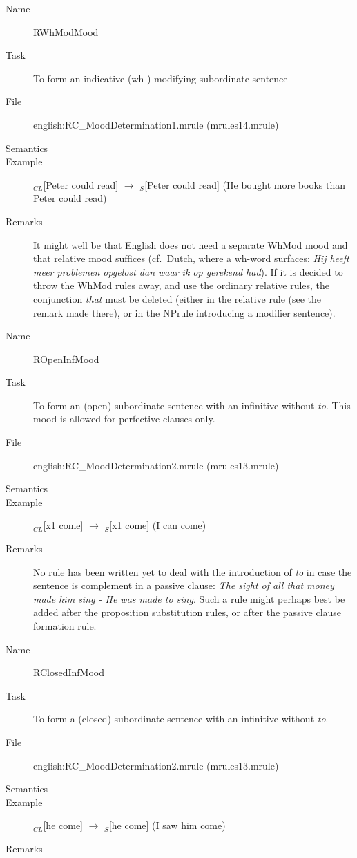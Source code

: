 \begin{description}
\vspace{1 cm}
\begin{description}
\item[Name] RWhModMood
\item[Task] To form an indicative (wh-) modifying subordinate sentence
\item[File] english:RC\_MoodDetermination1.mrule (mrules14.mrule)
\item[Semantics]
\item[Example] $_{CL}$[Peter could read] $\rightarrow$ $_S$[Peter could read] 
(He bought more books than Peter could read)
\item[Remarks] It might well be that English does not need a separate WhMod 
mood and that relative mood suffices (cf.\ Dutch, where a wh-word surfaces: 
{\em Hij heeft meer problemen opgelost dan {\em waar} ik op gerekend had\/}). If 
it is decided to throw the WhMod rules away, and use the ordinary relative 
rules, the conjunction {\em that\/} must be deleted (either in the relative rule
(see the remark made there), or in the NPrule introducing a modifier sentence).
\end{description}

\vspace{1 cm}
\begin{description}
\item[Name] ROpenInfMood
\item[Task] To form an (open) subordinate sentence with an infinitive without 
{\em to\/}. This mood is allowed for perfective clauses only.
\item[File] english:RC\_MoodDetermination2.mrule (mrules13.mrule)
\item[Semantics]
\item[Example] $_{CL}$[x1 come] $\rightarrow$ $_S$[x1 come] (I can come)
\item[Remarks] No rule has been written yet to deal with the introduction of 
{\em to\/} in case the sentence is complement in a passive clause: {\em The 
sight of all that money made him sing - He was made {\em to} sing\/}. Such a 
rule might perhaps best be added after the proposition substitution rules, or 
after the passive clause formation rule.
\end{description}

\vspace{1 cm}
\begin{description}
\item[Name] RClosedInfMood
\item[Task] To form a (closed) subordinate sentence with an infinitive without {
\em to\/}.
\item[File] english:RC\_MoodDetermination2.mrule (mrules13.mrule)
\item[Semantics]
\item[Example] $_{CL}$[he come] $\rightarrow$ $_S$[he come] (I saw him come)
\item[Remarks]
\end{description}


\end{description}
